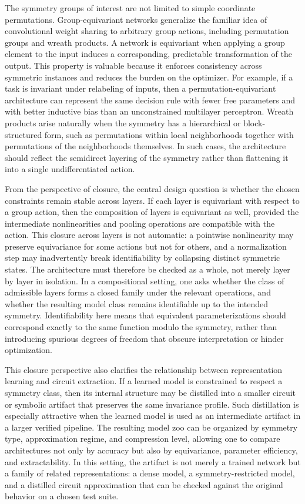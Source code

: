 The symmetry groups of interest are not limited to simple coordinate permutations. Group-equivariant networks generalize the familiar idea of convolutional weight sharing to arbitrary group actions, including permutation groups and wreath products. A network is equivariant when applying a group element to the input induces a corresponding, predictable transformation of the output. This property is valuable because it enforces consistency across symmetric instances and reduces the burden on the optimizer. For example, if a task is invariant under relabeling of inputs, then a permutation-equivariant architecture can represent the same decision rule with fewer free parameters and with better inductive bias than an unconstrained multilayer perceptron. Wreath products arise naturally when the symmetry has a hierarchical or block-structured form, such as permutations within local neighborhoods together with permutations of the neighborhoods themselves. In such cases, the architecture should reflect the semidirect layering of the symmetry rather than flattening it into a single undifferentiated action.

From the perspective of closure, the central design question is whether the chosen constraints remain stable across layers. If each layer is equivariant with respect to a group action, then the composition of layers is equivariant as well, provided the intermediate nonlinearities and pooling operations are compatible with the action. This closure across layers is not automatic: a pointwise nonlinearity may preserve equivariance for some actions but not for others, and a normalization step may inadvertently break identifiability by collapsing distinct symmetric states. The architecture must therefore be checked as a whole, not merely layer by layer in isolation. In a compositional setting, one asks whether the class of admissible layers forms a closed family under the relevant operations, and whether the resulting model class remains identifiable up to the intended symmetry. Identifiability here means that equivalent parameterizations should correspond exactly to the same function modulo the symmetry, rather than introducing spurious degrees of freedom that obscure interpretation or hinder optimization.

This closure perspective also clarifies the relationship between representation learning and circuit extraction. If a learned model is constrained to respect a symmetry class, then its internal structure may be distilled into a smaller circuit or symbolic artifact that preserves the same invariance profile. Such distillation is especially attractive when the learned model is used as an intermediate artifact in a larger verified pipeline. The resulting model zoo can be organized by symmetry type, approximation regime, and compression level, allowing one to compare architectures not only by accuracy but also by equivariance, parameter efficiency, and extractability. In this setting, the artifact is not merely a trained network but a family of related representations: a dense model, a symmetry-restricted model, and a distilled circuit approximation that can be checked against the original behavior on a chosen test suite.

